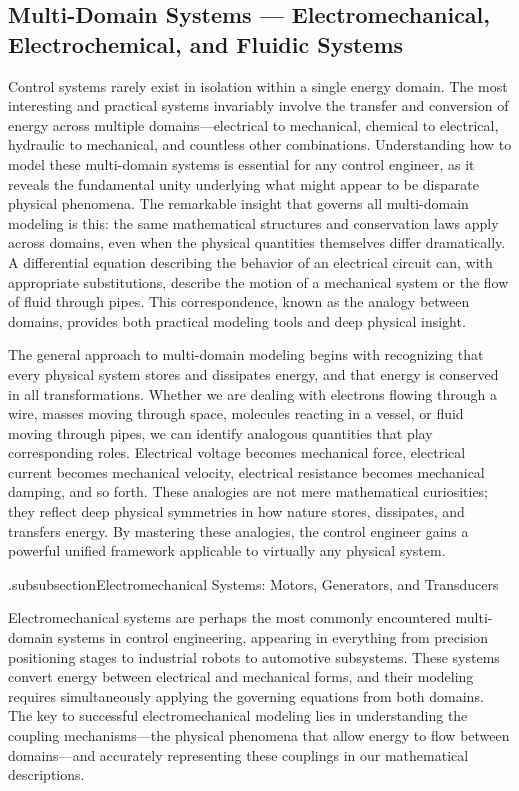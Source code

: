 \subsection{Multi-Domain Systems — Electromechanical, Electrochemical, and Fluidic Systems}

Control systems rarely exist in isolation within a single energy domain. The most interesting and practical systems invariably involve the transfer and conversion of energy across multiple domains—electrical to mechanical, chemical to electrical, hydraulic to mechanical, and countless other combinations. Understanding how to model these multi-domain systems is essential for any control engineer, as it reveals the fundamental unity underlying what might appear to be disparate physical phenomena. The remarkable insight that governs all multi-domain modeling is this: the same mathematical structures and conservation laws apply across domains, even when the physical quantities themselves differ dramatically. A differential equation describing the behavior of an electrical circuit can, with appropriate substitutions, describe the motion of a mechanical system or the flow of fluid through pipes. This correspondence, known as the analogy between domains, provides both practical modeling tools and deep physical insight.

The general approach to multi-domain modeling begins with recognizing that every physical system stores and dissipates energy, and that energy is conserved in all transformations. Whether we are dealing with electrons flowing through a wire, masses moving through space, molecules reacting in a vessel, or fluid moving through pipes, we can identify analogous quantities that play corresponding roles. Electrical voltage becomes mechanical force, electrical current becomes mechanical velocity, electrical resistance becomes mechanical damping, and so forth. These analogies are not mere mathematical curiosities; they reflect deep physical symmetries in how nature stores, dissipates, and transfers energy. By mastering these analogies, the control engineer gains a powerful unified framework applicable to virtually any physical system.

.subsubsection{Electromechanical Systems: Motors, Generators, and Transducers}

Electromechanical systems are perhaps the most commonly encountered multi-domain systems in control engineering, appearing in everything from precision positioning stages to industrial robots to automotive subsystems. These systems convert energy between electrical and mechanical forms, and their modeling requires simultaneously applying the governing equations from both domains. The key to successful electromechanical modeling lies in understanding the coupling mechanisms—the physical phenomena that allow energy to flow between domains—and accurately representing these couplings in our mathematical descriptions.

